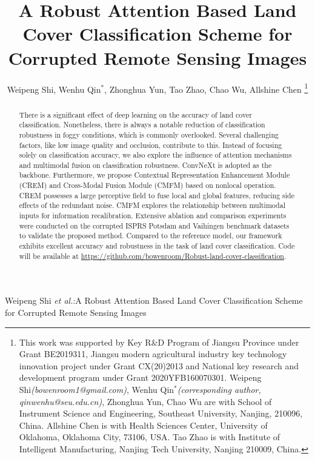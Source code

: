 \documentclass[lettersize,journal]{IEEEtran}
\begin{document}
\title{A Robust Attention Based Land Cover Classification Scheme for Corrupted Remote Sensing Images
}

\author{Weipeng Shi, Wenhu Qin$^{*}$, Zhonghua Yun, Tao Zhao, Chao Wu, Allshine Chen
    \thanks{This work was supported by Key R\&D Program of Jiangsu Province under Grant BE2019311, Jiangsu modern agricultural industry key technology innovation project under Grant CX(20)2013 and
        National key research and development program under Grant
        2020YFB160070301. Weipeng Shi\emph{(bowenroom1@gmail.com)}, Wenhu Qin$^{*}$\emph{(corresponding author, qinwenhu@seu.edu.cn)}, Zhonghua Yun,  Chao Wu are with School of Instrument Science and Engineering, Southeast University, Nanjing, 210096, China. Allshine Chen is with Health Sciences Center, University of Oklahoma, Oklahoma City, 73106, USA. Tao Zhao is with Institute of Intelligent Manufacturing, Nanjing Tech University, Nanjing 210009, China.}%
}

%
{Weipeng Shi \MakeLowercase{\textit{et al.}}:A Robust Attention Based Land Cover Classification Scheme for Corrupted Remote Sensing Images}


\maketitle

\begin{abstract}
    There is a significant effect of deep learning on the accuracy of land cover classification. Nonetheless, there is always a notable reduction of classification robustness in foggy conditions, which is commonly overlooked. Several challenging factors, like low image quality and occlusion, contribute to this. Instead of focusing solely on classification accuracy, we also explore the influence of attention mechanisms and multimodal fusion on classification robustness. ConvNeXt is adopted as the backbone. Furthermore, we propose Contextual Representation Enhancement Module (CREM) and Cross-Modal Fusion Module (CMFM) based on nonlocal operation. CREM possesses a large perceptive field to fuse local and global features, reducing side effects of the redundant noise. CMFM explores the relationship between multimodal inputs for information recalibration. Extensive ablation and comparison experiments were conducted on the corrupted ISPRS Potsdam and Vaihingen benchmark datasets to validate the proposed method. Compared to the reference model, our framework exhibits excellent accuracy and robustness in the task of land cover classification. Code will be available at \href{https://github.com/bowenroom/Robust-land-cover-classification}{https://github.com/bowenroom/Robust-land-cover-classification}.
\end{abstract}
\end{document}
